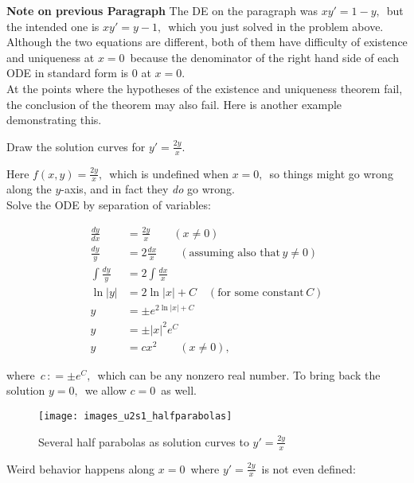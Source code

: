 \textbf{\color{orange}Note on previous Paragraph} 
The DE on the paragraph was $xy′=1−y,\,$
but the intended one is $xy′=y−1,\,$ which you just solved in the problem above.
Although the two equations are different,
both of them have difficulty of existence and uniqueness at $x=0\,$
because the denominator of the right hand side of each ODE in standard form is $0$ at $x=0$.\\

At the points where the hypotheses of the existence and uniqueness theorem fail,
the conclusion of the theorem may also fail. Here is another example demonstrating this. \\

\begin{example}
  Draw the solution curves for $y' = \frac{2y}{x}$. 
\end{example}

\Solution Here $f(x, y) = \frac{2y}{x},\,$ which is undefined when $x = 0,\,$
so things might go wrong along the $y$-axis, and in fact they \emph{do} go wrong. \\

Solve the ODE by separation of variables:

\begin{align*}
  \frac{dy}{dx} &= \frac{2y}{x} \qquad (x \neq 0) \\
  \frac{dy}{y} &= 2 \frac{dx}{x} \qquad (\text{assuming also that}\, y \neq 0) \\
  \int \frac{dy}{y} &= 2 \int \frac{dx}{x} \\
  \ln |y| &= 2 \ln |x| + C \quad (\text{for some constant}\, C) \\
  y &= \pm e^{2 \ln |x| + C} \\
  y &= \pm |x|^2 e^C \\
  y &= c x^2 \qquad (x \neq 0),                       
\end{align*}

\clearpage
where $\, c\,  \colon =\pm e^ C,\,$ which can be any nonzero real number.
To bring back the solution $y=0,\,$ we allow $c=0\,$ as well.

\begin{figure}[ht!]
  \centering
  \texttt{[image: images\_u2s1\_halfparabolas]}
  \caption{Several half parabolas as solution curves to $y' = \frac{2y}{x}$}
\end{figure}

Weird behavior happens along $x = 0\,$ where $y' = \frac{2y}{x}\,$ is not even defined:

